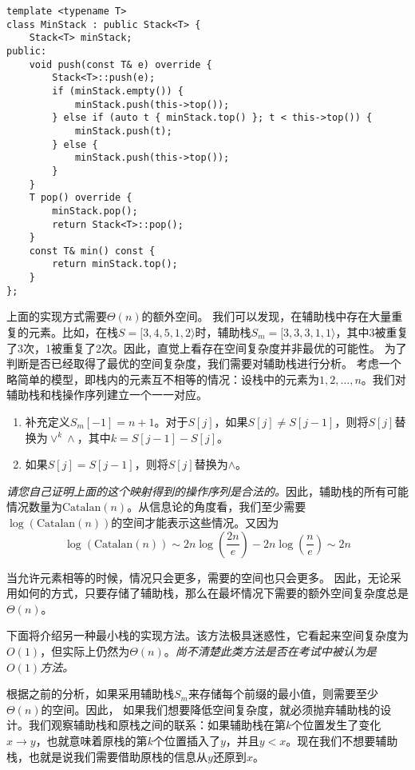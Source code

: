 \begin{lstlisting}
template <typename T>
class MinStack : public Stack<T> {
    Stack<T> minStack;
public:
    void push(const T& e) override {
        Stack<T>::push(e);
        if (minStack.empty()) {
            minStack.push(this->top());
        } else if (auto t { minStack.top() }; t < this->top()) {
            minStack.push(t);
        } else {
            minStack.push(this->top());
        }
    }
    T pop() override {
        minStack.pop();
        return Stack<T>::pop();
    }
    const T& min() const {
        return minStack.top();
    }
};
\end{lstlisting}

上面的实现方式需要$\Theta(n)$的额外空间。
我们可以发现，在辅助栈中存在大量重复的元素。比如，在栈$S=[3, 4, 5, 1, 2\rangle $时，辅助栈$S_m = [3, 3, 3, 1, 1\rangle$，其中3被重复了3次，1被重复了2次。因此，直觉上看存在空间复杂度并非最优的可能性。
为了判断是否已经取得了最优的空间复杂度，我们需要对辅助栈进行分析。
考虑一个略简单的模型，即栈内的元素互不相等的情况：设栈中的元素为$1,2,\dots,n$。我们对辅助栈和栈操作序列建立一个一一对应。

\begin{enumerate}
    \item 补充定义$S_m[-1]=n+1$。对于$S[j]$，如果$S[j]\ne S[j-1]$，则将$S[j]$替换为$\lor ^{k}\land$，其中$k = S[j-1] - S[j]$。
    \item 如果$S[j] = S[j-1]$，则将$S[j]$替换为$\land$。
\end{enumerate}

\textit{请您自己证明上面的这个映射得到的操作序列是合法的。}因此，辅助栈的所有可能情况数量为$\mathrm{Catalan}(n)$。从信息论的角度看，我们至少需要$\log\left(\mathrm{Catalan}(n)\right)$的空间才能表示这些情况。又因为
$$
\log\left(\mathrm{Catalan}(n)\right) \sim 2n\log \left(\frac{2n}{e}\right) - 2n \log \left(\frac{n}{e}\right)  \sim 2n
$$

当允许元素相等的时候，情况只会更多，需要的空间也只会更多。
因此，无论采用如何的方式，只要存储了辅助栈，那么在最坏情况下需要的额外空间复杂度总是$\Theta(n)$。

下面将介绍另一种最小栈的实现方法。该方法极具迷惑性，它看起来空间复杂度为$O(1)$，但实际上仍然为$\Theta(n)$。\textit{尚不清楚此类方法是否在考试中被认为是$O(1)$方法。}

根据之前的分析，如果采用辅助栈$S_m$来存储每个前缀的最小值，则需要至少$\Theta(n)$的空间。因此，
如果我们想要降低空间复杂度，就必须抛弃辅助栈的设计。我们观察辅助栈和原栈之间的联系：如果辅助栈在第$k$个位置发生了变化$x\to y$，也就意味着原栈的第$k$个位置插入了$y$，并且$y<x$。现在我们不想要辅助栈，也就是说我们需要借助原栈的信息从$y$还原到$x$。

